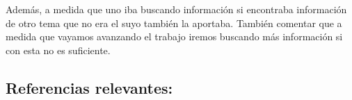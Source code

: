 %

Además, a medida que uno iba buscando información si encontraba información de otro tema que no era el suyo también la aportaba. 
También comentar que a medida que vayamos avanzando el trabajo iremos buscando más información si con esta no es suficiente.
\subsection{Referencias relevantes:}

